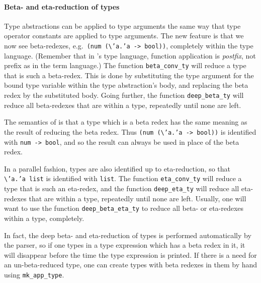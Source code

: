 \paragraph{Beta- and eta-reduction of types}

Type abstractions can be applied to type arguments the same way that
type operator constants are applied to type arguments.
The new feature is that we now see beta-redexes,
e.g.\ \texttt{(num (}{\small\verb|\|}\texttt{'a.'a~->~bool))},
completely within the type language.
(Remember that in \HOLW's type language, function application is {\it postfix},
not prefix as in the term language.)
The \ML{} function \texttt{beta\_conv\_ty} will reduce a type that is such
a beta-redex.
This is done by substituting the type argument for the bound
type variable within the type abstraction's body,
and replacing the beta redex by the substituted body.
Going further, the function \texttt{deep\_beta\_ty} will reduce
all beta-redexes that are within a type, repeatedly until none are left.

The semantics of \HOLW{} is that a type which is
a beta redex has the same meaning as the result of reducing the beta redex.
Thus \texttt{(num (}{\small\verb|\|}\texttt{'a.'a~->~bool))} is identified
with \texttt{num -> bool}, and so the result can always be used in place of
the beta redex.

In a parallel fashion, types are also identified up to eta-reduction, so that
{\small\verb|\|}\texttt{'a.'a~list} is identified with \texttt{list}.
The \ML{} function \texttt{eta\_conv\_ty} will reduce a type that is such
an eta-redex, and
the function \texttt{deep\_eta\_ty} will reduce
all eta-redexes that are within a type, repeatedly until none are left.
Usually, one will want to use the function \texttt{deep\_beta\_eta\_ty} to
reduce all beta- or eta-redexes within a type, completely.

In fact, the deep beta- and eta-reduction of types is performed automatically
by the parser, so if one types in a type expression which has a beta redex in
it, it will disappear before the time the type expression is printed.
If there is a need for an un-beta-reduced type, one can create types with
beta redexes in them by hand using \texttt{mk\_app\_type}.

